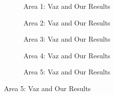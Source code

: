 \begin{figure}
	\centering
	\begin{subfigure}{\textwidth}
		\centering
		\caption{ Area 1: Vaz \cite{vaz_object_based_dune_analysis} and Our Results }
		\label{fig:mixed_ml_grad_area1_results}
	\end{subfigure}
	\begin{subfigure}{\textwidth}
		\centering
		\caption{ Area 2: Vaz \cite{vaz_object_based_dune_analysis} and Our Results }
		\label{fig:mixed_ml_grad_area2_results}
	\end{subfigure}
	\begin{subfigure}{\textwidth}
		\centering
		\caption{ Area 3: Vaz \cite{vaz_object_based_dune_analysis} and Our Results }
		\label{fig:mixed_ml_grad_area3_results}
	\end{subfigure}
	\begin{subfigure}{\textwidth}
		\centering
		\caption{ Area 4: Vaz \cite{vaz_object_based_dune_analysis} and Our Results }
		\label{fig:mixed_ml_grad_area4_results}
	\end{subfigure}
	\begin{subfigure}{\textwidth}
		\centering
		\caption{ Area 5: Vaz \cite{vaz_object_based_dune_analysis} and Our Results }
		\label{fig:mixed_ml_grad_area5_results}
	\end{subfigure}
\end{figure}
